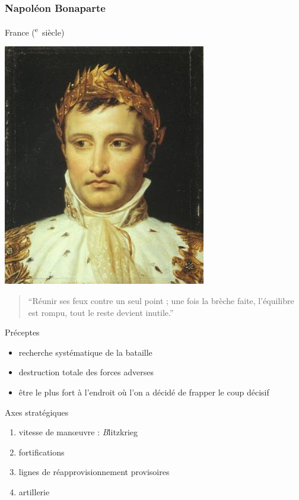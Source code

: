 \documentclass{article}
\newcommand{\cRM}[1]{\MakeUppercase{\romannumeral #1}}  %
\newcommand{\siecle}[1]{\cRM{#1}\textsuperscript{e}~siècle}
\begin{document}
\subsubsection{Napoléon Bonaparte}
France (\siecle{18})
\hfill \begin{minipage}{5cm}
\includegraphics[width=\linewidth]{../ressources/napoleon}
\end{minipage}
\begin{quote}“Réunir ses feux contre un seul point ; une fois la brèche faite, l’équilibre est rompu, tout le reste devient inutile.”\end{quote}
Préceptes
\begin{itemize}
\item recherche systématique de la bataille
\item destruction totale des forces adverses
\item être le plus fort à l’endroit où l’on a décidé de frapper le coup décisif
\end{itemize}
Axes stratégiques
\begin{enumerate}
\item vitesse de manœuvre : {\emph Blitzkrieg}
\item fortifications
\item lignes de réapprovisionnement provisoires
\item artillerie
\end{enumerate}
\cite{napoleon, napoleon_wiki, napoleon_portrait}
\end{document}
